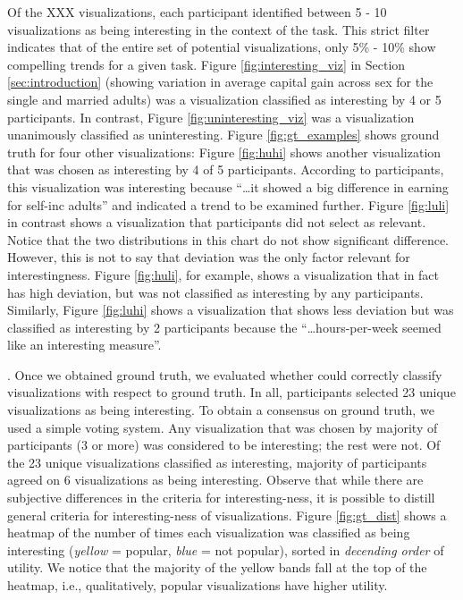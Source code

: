 Of the XXX visualizations, each participant identified between 5 - 10 visualizations 
as being interesting in the context of the task.
This strict filter indicates that of the entire set of potential visualizations, only 5\% - 10\%
show compelling trends for a given task.
Figure \ref{fig:interesting_viz} in Section \ref{sec:introduction} (showing variation in
average capital gain across sex for the single and married adults) was a visualization 
classified as interesting by 4 or 5 participants. 
In contrast, Figure \ref{fig:uninteresting_viz} was a visualization unanimously classified
as uninteresting.
Figure \ref{fig:gt_examples} shows ground truth for four other visualizations: 
Figure \ref{fig:huhi} shows another visualization that was chosen as interesting by 4 of 5 
participants.
According to participants, this visualization was interesting because ``\ldots it
showed a big difference in earning for self-inc adults'' and indicated a trend to 
be examined further.
Figure \ref{fig:luli} in contrast shows a visualization that participants
did not select as relevant.
Notice that the two distributions in this chart do not show significant difference. 
However, this is not to say that deviation was the only factor relevant for interestingness.
Figure \ref{fig:huli}, for example, shows a visualization that in fact has high deviation, but was 
not classified as interesting by any participants.
Similarly, Figure \ref{fig:luhi} shows a visualization that shows less deviation but was 
classified as interesting by 2 participants because the ``\ldots hours-per-week
seemed like an interesting measure''.

.
Once we obtained ground truth, we evaluated whether \SeeDB could correctly
classify visualizations with respect to ground truth.
In all, participants selected 23 unique visualizations as being interesting.
To obtain a consensus on ground truth, we used a simple voting system.
Any visualization that was chosen by majority of participants (3 or more)
was considered to be interesting; the rest were not.
Of the 23 unique visualizations classified as interesting, majority of participants 
agreed on 6 visualizations as being interesting.
Observe that while there are subjective differences in the criteria for interesting-ness,
it is possible to distill general criteria for interesting-ness of visualizations.
Figure \ref{fig:gt_dist} shows a heatmap of the number of times each
visualization was classified as being interesting 
({\em yellow} = popular, {\em blue} = not popular), sorted
in {\em decending order} of utility. 
We notice that the majority of the yellow bands fall at the top of the
heatmap, i.e., qualitatively, popular visualizations have higher utility.

